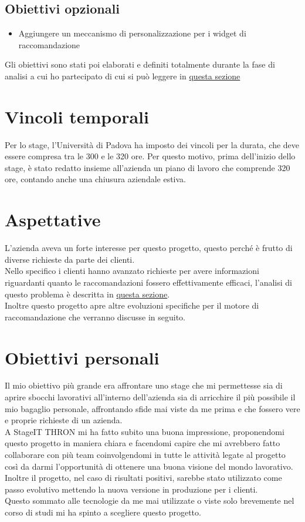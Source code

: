 \documentclass[a4paper, 12pt, twoside, openright]{book}
\begin{document}
\subsection{Obiettivi opzionali}
\begin{itemize}
\item Aggiungere un meccanismo di personalizzazione per i widget di raccomandazione
\end{itemize}

Gli obiettivi sono stati poi elaborati e definiti totalmente durante la fase di analisi a cui ho partecipato di cui si può leggere in \hyperref[analisi]{questa sezione}

\section{Vincoli temporali}
Per lo stage, l'Università di Padova ha imposto dei vincoli per la durata, che deve essere compresa tra le 300 e le 320 ore. Per questo motivo, prima dell'inizio dello stage, è stato redatto insieme all'azienda un piano di lavoro che comprende 320 ore, contando anche una chiusura aziendale estiva.

\section{Aspettative}
L'azienda aveva un forte interesse per questo progetto, questo perché è frutto di diverse richieste da parte dei clienti.\\
Nello specifico i clienti hanno avanzato richieste per avere informazioni riguardanti quanto le raccomandazioni fossero effettivamente efficaci, l'analisi di questo problema è descritta in \hyperref[analisi-pcr]{questa sezione}.\\
Inoltre questo progetto apre altre evoluzioni specifiche per il motore di raccomandazione che verranno discusse in seguito.

\section{Obiettivi personali}
Il mio obiettivo più grande era affrontare uno stage che mi permettesse sia di aprire sbocchi lavorativi all'interno dell'azienda sia di arricchire il più possibile il mio bagaglio personale, affrontando sfide mai viste da me prima e che fossero vere e proprie richieste di un azienda.\\
A StageIT THRON mi ha fatto subito una buona impressione, proponendomi questo progetto in maniera chiara e facendomi capire che mi avrebbero fatto collaborare con più team coinvolgendomi in tutte le attività legate al progetto così da darmi l'opportunità di ottenere una buona visione del mondo lavorativo.\\
Inoltre il progetto, nel caso di risultati positivi, sarebbe stato utilizzato come passo evolutivo mettendo la nuova versione in produzione per i clienti.\\
Questo sommato alle tecnologie da me mai utilizzate o viste solo brevemente nel corso di studi mi ha spinto a scegliere questo progetto.
\end{document}
